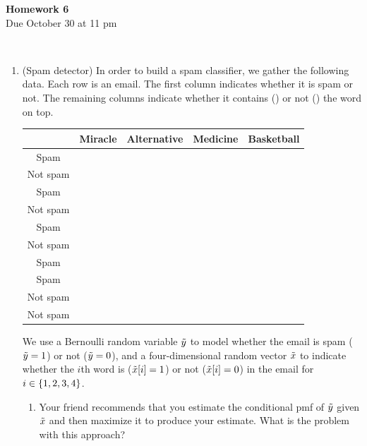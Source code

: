 \documentclass[12pt,twoside]{article}
\newcommand{\tick}{\ding{51}}%
\newcommand{\xmark}{\ding{55}}
\begin{document}
\begin{center}
{\large{\textbf{Homework 6}} } \vspace{0.2cm}\\
Due October 30 at 11 pm
\\
\end{center}
\\

\begin{enumerate}

\item (Spam detector) In order to build a spam classifier, we gather the following data. Each row is an email. The first column indicates whether it is spam or not. The remaining columns indicate whether it contains (\tick) or not (\xmark) the word on top.
\begin{center}
{\footnotesize
\begin{tabular}{ |c|c|c|c|c| } 
 \hline
 & Miracle  & Alternative & Medicine & Basketball \\
\hline 
Spam &  \tick  & \tick& \tick & \tick  \\
\hline
Not spam &  \xmark  & \xmark& \tick & \tick  \\
\hline 
Spam &  \tick  & \xmark& \xmark & \xmark  \\
\hline
Not spam &  \xmark  & \tick& \xmark & \xmark  \\
\hline
Spam &  \tick  & \xmark& \xmark & \xmark  \\
\hline
Not spam &  \xmark  & \tick& \xmark & \tick  \\
\hline 
Spam &  \tick  & \xmark& \xmark & \xmark  \\
\hline
Spam &  \xmark  & \tick& \tick & \xmark  \\
\hline
Not spam &  \tick  & \tick& \xmark & \tick  \\
\hline
Not spam &  \xmark  & \xmark& \tick & \tick  \\
\hline 
\end{tabular}
}
\end{center}
We use a Bernoulli random variable $\tilde{  y }$ to model whether the email is spam ($\tilde{  y }=1$) or not ($\tilde{  y }=0$), and a four-dimensional random vector $\tilde{  x }$ to indicate whether the $i$th word is  ($\tilde{  x }[i]=1$) or not ($\tilde{  x }[i]=0$) in the email for $i \in \left\{ 1,2,3,4 \right\}$.
\begin{enumerate}
\item  Your friend recommends that you estimate the conditional pmf of $\tilde{  y }$ given $\tilde{  x }$ and then maximize it to produce your estimate. What is the problem with this approach?


\end{enumerate}
\end{enumerate}
\end{document}
